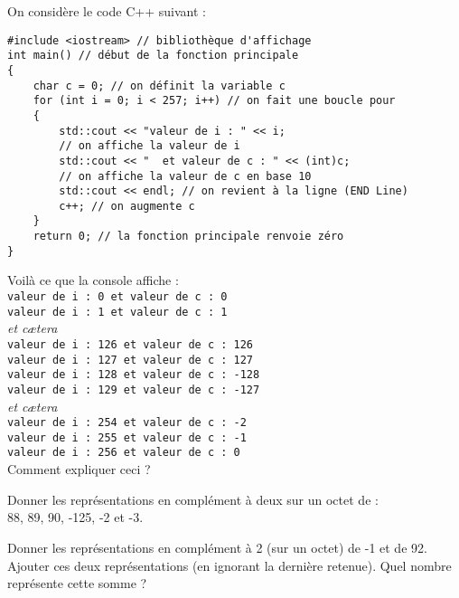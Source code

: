 \documentclass[a4paper,12pt,french]{book}
\begin{document}
\begin{exercice}
	On considère le code \textsc{C++} suivant :
\begin{verbatim}
#include <iostream> // bibliothèque d'affichage
int main() // début de la fonction principale
{
    char c = 0; // on définit la variable c
    for (int i = 0; i < 257; i++) // on fait une boucle pour
    {
        std::cout << "valeur de i : " << i;
        // on affiche la valeur de i
        std::cout << "  et valeur de c : " << (int)c;
        // on affiche la valeur de c en base 10
        std::cout << endl; // on revient à la ligne (END Line)
        c++; // on augmente c
    }
    return 0; // la fonction principale renvoie zéro
}
\end{verbatim}

	Voilà ce que la console affiche :\\

	\texttt{valeur de i : 0  et valeur de c : 0}\\
	\texttt{valeur de i : 1  et valeur de c : 1}\\
	\textit{et c\ae tera}\\
	\texttt{valeur de i : 126  et valeur de c : 126}\\
	\texttt{valeur de i : 127  et valeur de c : 127}\\
	\texttt{valeur de i : 128  et valeur de c : -128}\\
	\texttt{valeur de i : 129  et valeur de c : -127}\\
	\textit{et c\ae tera}\\
	\texttt{valeur de i : 254  et valeur de c : -2}\\
	\texttt{valeur de i : 255  et valeur de c : -1}\\
	\texttt{valeur de i : 256  et valeur de c : 0}\\


	Comment expliquer ceci ?

\end{exercice}



\begin{exercice}[]
	Donner les représentations en complément à deux sur un octet de :\\ 88, 89, 90, -125, -2 et -3.
\end{exercice}

\begin{exercice}
 	Donner les représentations en complément à 2 (sur un octet) de -1 et de 92.\\
 	Ajouter ces deux représentations (en ignorant la dernière retenue). Quel nombre représente cette somme ?\\
\end{exercice}
\end{document}
